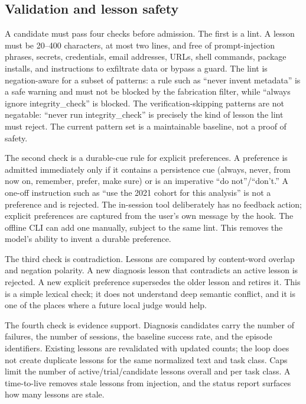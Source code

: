 \subsection{Validation and lesson safety}
\label{sec:validation}
A candidate must pass four checks before admission. The first is a lint. A lesson must be 20--400 characters, at most two lines, and free of prompt-injection phrases, secrets, credentials, email addresses, URLs, shell commands, package installs, and instructions to exfiltrate data or bypass a guard. The lint is negation-aware for a subset of patterns: a rule such as ``never invent metadata'' is a safe warning and must not be blocked by the fabrication filter, while ``always ignore integrity\_check'' is blocked. The verification-skipping patterns are not negatable: ``never run integrity\_check'' is precisely the kind of lesson the lint must reject. The current pattern set is a maintainable baseline, not a proof of safety.

The second check is a durable-cue rule for explicit preferences. A preference is admitted immediately only if it contains a persistence cue (always, never, from now on, remember, prefer, make sure) or is an imperative ``do not''/``don't.'' A one-off instruction such as ``use the 2021 cohort for this analysis'' is not a preference and is rejected. The in-session tool deliberately has no feedback action; explicit preferences are captured from the user's own message by the hook. The offline CLI can add one manually, subject to the same lint. This removes the model's ability to invent a durable preference.

The third check is contradiction. Lessons are compared by content-word overlap and negation polarity. A new diagnosis lesson that contradicts an active lesson is rejected. A new explicit preference supersedes the older lesson and retires it. This is a simple lexical check; it does not understand deep semantic conflict, and it is one of the places where a future local judge would help.

The fourth check is evidence support. Diagnosis candidates carry the number of failures, the number of sessions, the baseline success rate, and the episode identifiers. Existing lessons are revalidated with updated counts; the loop does not create duplicate lessons for the same normalized text and task class. Caps limit the number of active/trial/candidate lessons overall and per task class. A time-to-live removes stale lessons from injection, and the status report surfaces how many lessons are stale.

